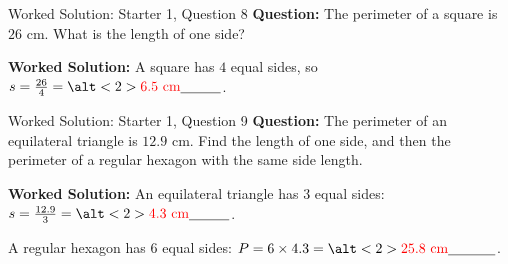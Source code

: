 \documentclass{beamer}
\newcommand{\ablank}[1]{%
  \alt<2>{\textcolor{red}{#1}}{\underline{\phantom{#1}}}%
}
\begin{document}
\begin{frame}{Worked Solution: Starter 1, Question 8}
\small
\textbf{Question:} The perimeter of a square is \(26\) cm. What is the length of one side?

\textbf{Worked Solution:} A square has \(4\) equal sides, so
\(s=\frac{26}{4}=\ablank{6.5\text{ cm}}\).
\end{frame}

\begin{frame}{Worked Solution: Starter 1, Question 9}
\small
\textbf{Question:} The perimeter of an equilateral triangle is \(12.9\) cm. Find the length of one side, and then the perimeter of a regular hexagon with the same side length.

\textbf{Worked Solution:} An equilateral triangle has \(3\) equal sides:
\(s=\frac{12.9}{3}=\ablank{4.3\text{ cm}}\).

A regular hexagon has \(6\) equal sides:
\(P=6\times4.3=\ablank{25.8\text{ cm}}\).
\end{frame}
\end{document}
